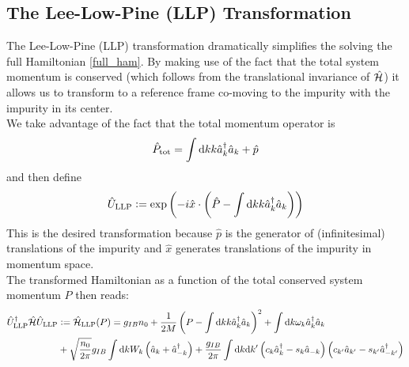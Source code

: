\subsection{The Lee-Low-Pine (LLP) Transformation}
The Lee-Low-Pine (LLP) transformation \cite{LLP} dramatically simplifies the solving the full Hamiltonian \ref{full_ham}. By making use of the fact that the total system momentum is conserved (which follows from the translational invariance of $\hat{\mathcal{H}}$) it allows us to transform to a reference frame co-moving to the impurity with the impurity in its center. \\
We take advantage of the fact that the total momentum operator is 
\begin{equation}
\hat P_{\mathrm{tot}} = \int\mathrm d k k \hat a^\dagger_k\hat a_k + \hat p
\end{equation}
and then define
\begin{equation}
\hat U_{\mathrm{LLP}}\vcentcolon= \exp\left(-i\hat x\cdot \left(\hat P - \int\mathrm d k k \hat a^\dagger_k\hat a_k\right)\right)
\end{equation}
This is the desired transformation because $\hat p$ is the generator of (infinitesimal) translations of the impurity and $\hat x$ generates translations of the impurity in momentum space.\\
The transformed Hamiltonian as a function of the total conserved system momentum $P$ then reads:
\begin{align}\label{ham_LLP}
\hat U_{\mathrm{LLP}}^\dagger\hat{\mathcal{H}}\hat U_{\mathrm{LLP}} &\vcentcolon= \hat{\mathcal{H}}_{\mathrm{LLP}}(P) =g_{IB}n_0+\frac{1}{2M}\left(P-\int\mathrm d k k \hat a^\dagger_k\hat a_k \right)^2+\int\mathrm d k\omega_{ k}\hat a^\dagger_{ k}\hat a_{ k}\\
&+\sqrt{\frac{n_0}{2\pi}}g_{IB}\int \mathrm d k W_k \left(\hat a_{ k}+\hat a^\dagger_{- k}\right) + \frac{g_{IB}}{2\pi}\int\mathrm d k\mathrm d k^\prime \left(c_k\hat a^\dagger_k-s_k\hat a_{-k}\right)\left(c_{k^\prime}\hat a_{k^\prime}-s_{k^\prime}\hat a^\dagger_{-k^\prime}\right)\nonumber
\end{align}


